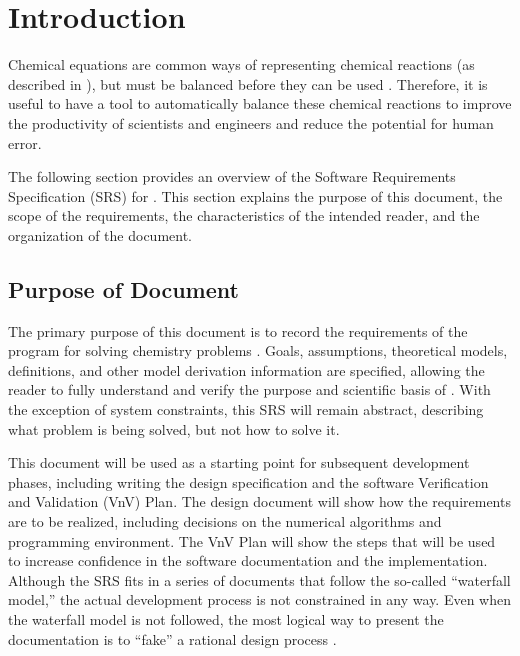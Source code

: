 \documentclass[12pt]{article}
\begin{document}

\newpage



\section{Introduction} \label{sec_intro}
Chemical equations are common ways of representing chemical reactions (as
described in ), but must be balanced before they can
be used \cite{lund_introduction_2023}. Therefore, it is useful to have a
tool to automatically balance these chemical reactions to improve the
productivity of scientists and engineers and reduce the potential for human
error.

The following section provides an overview of the Software Requirements
Specification (SRS) for \progname{}. This section explains the purpose of this
document, the scope of the requirements, the characteristics of the intended
reader, and the organization of the document.

\subsection{Purpose of Document}

The primary purpose of this document is to record the requirements of the
program for solving chemistry problems .
Goals, assumptions, theoretical models,
definitions, and other model derivation information are specified, allowing the
reader to fully understand and verify the purpose and scientific basis of
\progname{}. With the exception of system constraints, this SRS will remain
abstract, describing what problem is being solved, but not how to solve it.

This document will be used as a starting point for subsequent development
phases, including writing the design specification and the software Verification
and Validation (VnV) Plan. The design document will show how the requirements
are to be realized, including decisions on the numerical algorithms and
programming environment. The VnV Plan will show the steps that will be used to
increase confidence in the software documentation and the implementation.
Although the SRS fits in a series of documents that follow the so-called
``waterfall model,'' the actual development process is not constrained in any
way. Even when the waterfall model is not followed, the most logical way to
present the documentation is to ``fake'' a rational design process
\cite{ParnasAndClements1986}.
\end{document}
